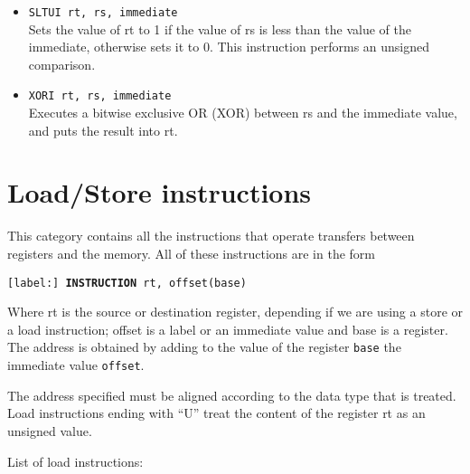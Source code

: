 \documentclass[12pt]{report}
\begin{document}
\begin{itemize}
	\item \texttt{SLTUI rt, rs, immediate}\\
	Sets the value of rt to 1 if the value of rs is less than the value of the
	immediate, otherwise sets it to 0. This instruction performs an unsigned comparison.

	\item \texttt{XORI rt, rs, immediate}\\
	Executes a bitwise exclusive OR (XOR) between rs and the immediate value,
	and puts the result into rt.

\end{itemize}

\section{Load/Store instructions}
This category contains all the instructions that operate transfers between
registers and the memory. All of these instructions are in the form

\begin{center}
	\texttt{[label:] \textbf{INSTRUCTION} rt, offset(base)}
\end{center}

Where rt is the source or destination register, depending if we are using a
store or a load instruction; offset is a label or an immediate value and base is
a register. The address is obtained by adding to the value of the register
\texttt{base} the immediate value \texttt{offset}.

The address specified must be aligned according to the data type that is
treated. Load instructions ending with ``U'' treat the content of the register
rt as an unsigned value.

List of load instructions:
\end{document}
